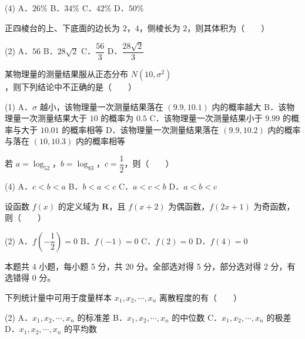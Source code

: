\begin{gkopts}(4)
\task A．$26\%$
\task B．$34\%$
\task C．$42\%$
\task D．$50\%$
\end{gkopts}

正四棱台的上、下底面的边长为 $2$，$4$，侧棱长为 $2$，则其体积为（　　）

\begin{gkopts}(2)
\task A．$56$
\task B．$28\sqrt2$
\task C．$\dfrac{56}3$
\task D．$\dfrac{28\sqrt2}3$
\end{gkopts}

某物理量的测量结果服从正态分布 $N\left(10,\sigma^{2}\right)$，则下列结论中不正确的是（　　）

\begin{gkopts}(1)
\task A．$\sigma$ 越小，该物理量一次测量结果落在 $(9.9,10.1)$ 内的概率越大
\task B．该物理量一次测量结果大于 $10$ 的概率为 $0.5$
\task C．该物理量一次测量结果小于 $9.99$ 的概率与大于 $10.01$ 的概率相等
\task D．该物理量一次测量结果落在 $(9.9,10.2)$ 内的概率与落在 $(10,10.3)$ 内的概率相等
\end{gkopts}

若 $a=\log_52$，$b=\log_83$，$c=\dfrac12$，则（　　）

\begin{gkopts}(4)
\task A．$c<b<a$
\task B．$b<a<c$
\task C．$a<c<b$
\task D．$a<b<c$
\end{gkopts}

设函数 $f(x)$ 的定义域为 $\mathbf R$，且 $f(x+2)$ 为偶函数，$f(2x+1)$ 为奇函数，则（　　）

\begin{gkopts}(2)
\task A．$f\left(-\dfrac12\right)=0$
\task B．$f(-1)=0$
\task C．$f(2)=0$
\task D．$f(4)=0$
\end{gkopts}

\par\medskip


\begin{gktip}
本题共 4 小题，每小题 5 分，共 20 分。全部选对得 5 分，部分选对得 2 分，有选错得 0 分。
\end{gktip}

下列统计量中可用于度量样本 $x_1,x_2,\cdots,x_n$ 离散程度的有（　　）

\begin{gkopts}(2)
\task A．$x_1,x_2,\cdots,x_n$ 的标准差
\task B．$x_1,x_2,\cdots,x_n$ 的中位数
\task C．$x_1,x_2,\cdots,x_n$ 的极差
\task D．$x_1,x_2,\cdots,x_n$ 的平均数
\end{gkopts}

